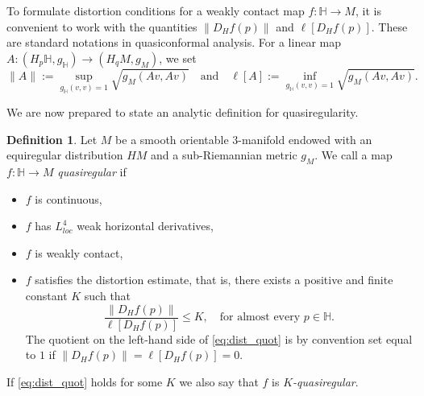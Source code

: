 \documentclass[10pt,letterpaper]{amsart}
\theoremstyle{definition}
\newtheorem{definition}[thm]{Definition}
\numberwithin{thm}{subsection}
\numberwithin{equation}{section}
\begin{document}
To formulate distortion conditions for a weakly contact map
$f:{\mathbb H} \to M$, it is convenient to work with the quantities
$\|D_H f(p)\|$ and $\ell[D_H f(p)]$. These are standard notations
in quasiconformal analysis. For a linear map $A:(H_p
{\mathbb H},g_{\mathbb H}) \to (H_{q} M,g_{M})$, we set
\begin{displaymath}
 \|A\|:= \sup_{g_{\mathbb H}(v,v)=1}\sqrt{g_M(Av,Av)}\quad \text{and} \quad \ell[A]:= \inf_{g_{\mathbb H}(v,v)=1}\sqrt{g_M(Av,Av)}.
\end{displaymath}

We are now prepared to state an analytic definition for quasiregularity.

\begin{definition}\label{d:QR_def}
Let $M$ be a smooth orientable $3$-manifold endowed with an equiregular
distribution $HM$ and a sub-Riemannian metric $g_M$. We call a map
$f:{\mathbb H} \to M$ \emph{quasiregular} if
\begin{itemize}
\item $f$ is continuous,
\item $f$ has {$L^4_{loc}$ weak horizontal derivatives},
\item $f$ is weakly contact,
\item $f$ satisfies the distortion estimate, that is, there exists a positive and finite constant $K$ such that
\begin{equation}\label{eq:dist_quot}
 \frac{\|D_H f(p)\|}{\ell[D_H f(p)]}\leq K,\quad\text{for almost every }p\in {\mathbb H}.
\end{equation}
The quotient on the left-hand side of \eqref{eq:dist_quot} is by convention set equal to $1$ if $\|D_H f(p)\|=\ell[D_H f(p)]=0$.
\end{itemize}
If \eqref{eq:dist_quot} holds for some $K$ we also say that $f$ is {\it $K$-quasiregular}.
\end{definition}
\end{document}
